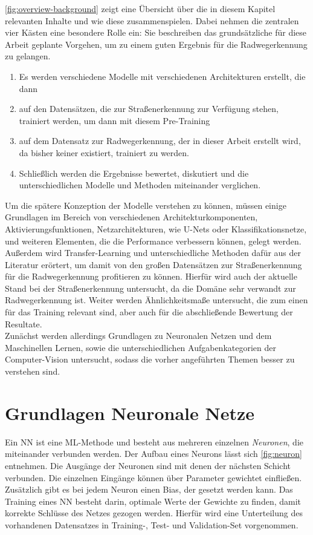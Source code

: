 \autoref{fig:overview-background} zeigt eine Übersicht über die in diesem Kapitel relevanten Inhalte und wie diese 
zusammenspielen. Dabei nehmen die zentralen vier Kästen eine besondere Rolle ein: Sie beschreiben das grundsätzliche 
für diese Arbeit geplante Vorgehen, um zu einem guten Ergebnis für die Radwegerkennung zu gelangen. 
\begin{enumerate}
	\item Es werden verschiedene Modelle mit verschiedenen Architekturen erstellt, die dann
	\item auf den Datensätzen, die zur Straßenerkennung zur Verfügung stehen, trainiert werden, um dann mit diesem Pre-Training
	\item auf dem Datensatz zur Radwegerkennung, der in dieser Arbeit erstellt wird, da  
    bisher keiner existiert, trainiert zu werden.
	\item Schließlich werden die Ergebnisse bewertet, diskutiert und die unterschiedlichen Modelle und Methoden miteinander verglichen.  
\end{enumerate}
Um die spätere Konzeption der Modelle verstehen zu können, müssen einige Grundlagen im Bereich von verschiedenen 
Architekturkomponenten, Aktivierungsfunktionen, Netzarchitekturen, wie U-Nets oder Klassifikationsnetze, und 
weiteren Elementen, die die Performance verbessern können, gelegt werden. 
Außerdem wird Transfer-Learning und unterschiedliche Methoden dafür aus der Literatur erörtert, um damit von den 
großen Datensätzen zur Straßenerkennung für die Radwegerkennung profitieren zu können. 
Hierfür wird auch der aktuelle Stand bei der Straßenerkennung untersucht, da die Domäne sehr verwandt zur Radwegerkennung ist.
Weiter werden Ähnlichkeitsmaße untersucht, die zum einen für das Training relevant sind, aber auch für die 
abschließende Bewertung der Resultate.  \\
Zunächst werden allerdings Grundlagen zu Neuronalen Netzen und dem Maschinellen Lernen, 
sowie die unterschiedlichen Aufgabenkategorien der Computer-Vision untersucht, sodass die vorher angeführten Themen 
besser zu verstehen sind.  

\section{Grundlagen Neuronale Netze}

Ein \ac{NN} ist eine \ac{ML}-Methode und besteht aus mehreren einzelnen \textit{Neuronen}, die miteinander verbunden werden.
Der Aufbau eines Neurons lässt sich \autoref{fig:neuron} entnehmen.
Die Ausgänge der Neuronen sind mit denen der nächsten Schicht verbunden.
Die einzelnen Eingänge können über Parameter gewichtet einfließen.
Zusätzlich gibt es bei jedem Neuron einen Bias, der gesetzt werden kann.
Das Training eines \ac{NN} besteht darin, optimale Werte der Gewichte zu finden, damit korrekte Schlüsse des Netzes gezogen werden.
Hierfür wird eine Unterteilung des vorhandenen Datensatzes in Training-, Test- und Validation-Set vorgenommen.

